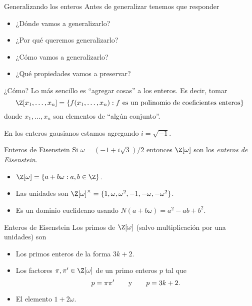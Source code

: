 \begin{frame}{Generalizando los enteros}
  Antes de generalizar tenemos que responder
  \begin{itemize}[<+->]
    \item ¿Dónde vamos a generalizarlo?\bigskip
    
    \item ¿Por qué queremos generalizarlo? \bigskip
     
    \item ¿Cómo vamos a generalizarlo? \bigskip
    
    \item ¿Qué propiedades vamos a preservar? \bigskip
  \end{itemize}
\end{frame}


\begin{frame}{¿Cómo?}
  Lo más sencillo es ``agregar cosas'' a los enteros. Es decir, tomar
  \[
    \Z[x_1, \ldots, x_n] = \{ f(x_1, \ldots, x_n) : f \ \text{es un polinomio de coeficientes enteros} \}
  \]
  donde $x_1, \ldots, x_n$ son elementos de ``algún conjunto''.

  \pause\bigskip

  En los enteros gausianos estamos agregando $i = \sqrt{-1}$.
\end{frame}


\begin{frame}{Enteros de Eisenstein}
  Si $\omega = (-1+i\sqrt{3})/2$ entonces $\Z[\omega]$ son los \emph{enteros de Eisenstein}.

  \pause\bigskip
  \begin{itemize}[<+->]
    \item $\Z[\omega] = \{ a+b\omega : a,b \in \Z \}$.
    \bigskip
    
    \item Las unidades son $\Z[\omega]^\times = \{ 1, \omega, \omega^2, -1, -\omega, -\omega^2 \}$.
    \bigskip

    \item Es un dominio euclideano usando $N(a+b\omega) = a^2 -ab + b^2$.
  \end{itemize}
\end{frame}



\begin{frame}{Enteros de Eisenstein}
  Los primos de $\Z[\omega]$ (salvo multiplicación por una unidades) son
  \begin{itemize}[<+->]
    \item Los primos enteros de la forma $3k+2$.
    \bigskip
    
    \item Los factores $\pi, \pi' \in \Z[\omega]$ de un primo enteros $p$ tal que
    \[
      p = \pi \pi' \qquad\text{y}\qquad p = 3k+2.
    \]

    \item El elemento $1+2\omega$.
  \end{itemize}
\end{frame}



